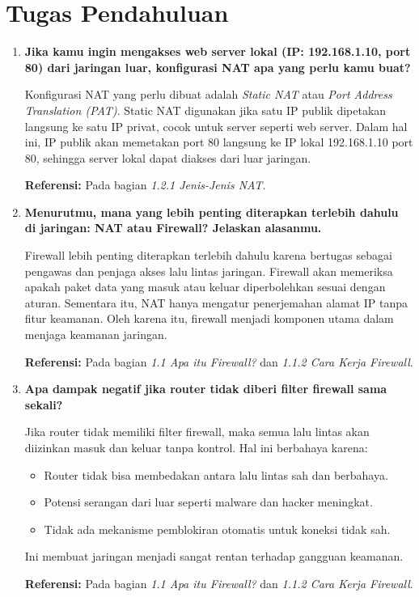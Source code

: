 \section{Tugas Pendahuluan}
\begin{enumerate}
    \item \textbf{Jika kamu ingin mengakses web server lokal (IP: 192.168.1.10, port 80) dari jaringan luar, konfigurasi NAT apa yang perlu kamu buat?}

    Konfigurasi NAT yang perlu dibuat adalah \textit{Static NAT} atau \textit{Port Address Translation (PAT)}. Static NAT digunakan jika satu IP publik dipetakan langsung ke satu IP privat, cocok untuk server seperti web server. Dalam hal ini, IP publik akan memetakan port 80 langsung ke IP lokal 192.168.1.10 port 80, sehingga server lokal dapat diakses dari luar jaringan.

    \textbf{Referensi:} Pada bagian \textit{1.2.1 Jenis-Jenis NAT}.

    \item \textbf{Menurutmu, mana yang lebih penting diterapkan terlebih dahulu di jaringan: NAT atau Firewall? Jelaskan alasanmu.}

    Firewall lebih penting diterapkan terlebih dahulu karena bertugas sebagai pengawas dan penjaga akses lalu lintas jaringan. Firewall akan memeriksa apakah paket data yang masuk atau keluar diperbolehkan sesuai dengan aturan. Sementara itu, NAT hanya mengatur penerjemahan alamat IP tanpa fitur keamanan. Oleh karena itu, firewall menjadi komponen utama dalam menjaga keamanan jaringan.

    \textbf{Referensi:} Pada bagian \textit{1.1 Apa itu Firewall?} dan \textit{1.1.2 Cara Kerja Firewall}.

    \item \textbf{Apa dampak negatif jika router tidak diberi filter firewall sama sekali?}

    Jika router tidak memiliki filter firewall, maka semua lalu lintas akan diizinkan masuk dan keluar tanpa kontrol. Hal ini berbahaya karena:
    \begin{itemize}
        \item Router tidak bisa membedakan antara lalu lintas sah dan berbahaya.
        \item Potensi serangan dari luar seperti malware dan hacker meningkat.
        \item Tidak ada mekanisme pemblokiran otomatis untuk koneksi tidak sah.
    \end{itemize}
    Ini membuat jaringan menjadi sangat rentan terhadap gangguan keamanan.

    \textbf{Referensi:} Pada bagian \textit{1.1 Apa itu Firewall?} dan \textit{1.1.2 Cara Kerja Firewall}.
\end{enumerate}
